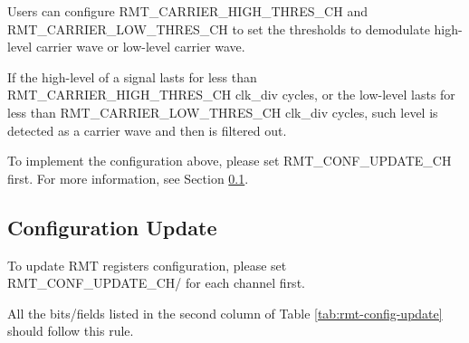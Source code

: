 \documentclass[main\_\_EN.tex]{subfiles}
\begin{document}
 Users can configure RMT\_CARRIER\_HIGH\_THRES\_CH and RMT\_CARRIER\_LOW\_THRES\_CH to set the thresholds to demodulate high-level carrier wave or low-level carrier wave.
 
 If the high-level of a signal lasts for less than RMT\_CARRIER\_HIGH\_THRES\_CH clk\_div cycles, or the low-level lasts for less than RMT\_CARRIER\_LOW\_THRES\_CH clk\_div cycles, such level is detected as a carrier wave and then is filtered out.

To implement the configuration above, please set RMT\_CONF\_UPDATE\_CH first. For more information, see Section \ref{conf_update}.

\subsection{Configuration Update}\label{conf_update}

To update RMT registers configuration, please set RMT\_CONF\_UPDATE\_CH/ for each channel first.

All the bits/fields listed in the second column of Table \ref{tab:rmt-config-update} should follow this rule.
\end{document}
